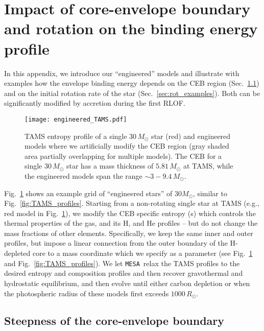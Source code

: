 \documentclass[twocolumn,twocolappendix,trackchanges]{aastex63}
\newcommand{\code}[1]{\texttt{#1}}
\newcommand{\mesa}{\code{MESA}}
\DeclareRobustCommand{\Figref}[1]{Fig.~\ref{#1}}
\DeclareRobustCommand{\Secref}[1]{Sec.~\ref{#1}}
\begin{document}



\appendix

\section{Impact of core-envelope boundary and rotation on the binding  energy profile}
\label{sec:toy_models}

In this appendix, we introduce our ``engineered'' models and
illustrate with examples how the
envelope binding energy depends on the CEB
region
(\Secref{sec:eng_examples}) and on the initial rotation rate of the
star (\Secref{sec:rot_examples}). Both can be significantly modified
by accretion during the first RLOF.

\begin{figure}[hbtp]
  \texttt{[image: engineered\_TAMS.pdf]}
  \caption{TAMS entropy profile of a single 30\,$M_\odot$ star (red)
    and engineered models where we artificially modify the CEB region
    (gray shaded area partially overlapping for multiple models). The CEB for a
    single $30\,M_\odot$ star has a mass thickness of $5.81\,M_\odot$ at TAMS,
    while the engineered models span the range $\sim3-9.4\,M_\odot$.}
  \label{fig:engineered_TAMS}
\end{figure}

\Figref{fig:engineered_TAMS} shows an example grid of ``engineered
stars'' of $30M_\odot$, similar to \Figref{fig:TAMS_profiles}.
Starting from a non-rotating single star at TAMS (e.g., red model in
\Figref{fig:engineered_TAMS}), we modify the CEB specific entropy (s)
which controls the thermal properties of the gas, and its H, and He
profiles -- but do not change the mass fractions of other elements.
Specifically, we keep the same inner and outer profiles, but impose a
linear connection from the outer boundary of the H-depleted core to a
mass coordinate which we specify as a parameter (see
\Figref{fig:engineered_TAMS} and \Figref{fig:TAMS_profiles}). We let \mesa\ relax
the TAMS profiles to the desired entropy and composition profiles and
then recover gravothermal and hydrostatic equilibrium, and then evolve
until either carbon depletion or when the photospheric radius of these
models first exceeds
$1000\,R_\odot$.



\subsection{Steepness of the core-envelope boundary}
\label{sec:eng_examples}
\end{document}
